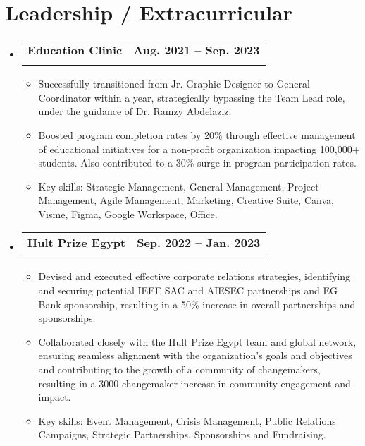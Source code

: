 \documentclass[letterpaper,11pt]{article}
\makeatletter
\newcommand{\resumeItem}[1]{
  \item\small{
    {#1 \vspace{-2pt}}
  }
}
\newcommand{\resumeSubheading}[4]{
  \vspace{-3pt}\item
    \begin{tabular*}{1.0\textwidth}[t]{l@{\extracolsep{\fill}}r}
      \textbf{#1} & \textbf{\small #2}\vspace{-3pt} \\
      \text{\footnotesize#3} & \text{\footnotesize #4} \\
    \end{tabular*}\vspace{-8pt}
}
\newcommand{\resumeSubHeadingListStart}{\begin{itemize}[leftmargin=0.0in, label={}]}
\newcommand{\resumeSubHeadingListEnd}{\end{itemize}}
\newcommand{\resumeItemListStart}{\begin{itemize}}
\newcommand{\resumeItemListEnd}{\end{itemize}\vspace{-5pt}}
\makeatother
\begin{document}
\vspace{-10pt}
\section{Leadership / Extracurricular}
    \resumeSubHeadingListStart
    \resumeSubheading
      {Education Clinic}{Aug. 2021 -- Sep. 2023}
      {General Coordinator}{Remote}
      \resumeItemListStart \vspace{-5pt}
        \resumeItem{Successfully transitioned from Jr. Graphic Designer to General Coordinator within a year, strategically bypassing the Team Lead role, under the guidance of Dr. Ramzy Abdelaziz.} \vspace{-5pt}
        \resumeItem{Boosted program completion rates by 20\% through effective management of educational initiatives for a non-profit organization impacting 100,000+ students. Also contributed to a 30\% surge in program participation rates.} \vspace{-5pt}
        \resumeItem{Key skills: Strategic Management, General Management, Project Management, Agile Management, Marketing, Creative Suite, Canva, Visme, Figma,  Google Workspace, Office.}
      \resumeItemListEnd \newpage
    \resumeSubheading
      {Hult Prize Egypt}{Sep. 2022 -- Jan. 2023}
      {Corporate Relations Specialist}{Remote}
      \resumeItemListStart \vspace{-5pt}
        \resumeItem{Devised and executed effective corporate relations strategies, identifying and securing potential IEEE SAC and AIESEC partnerships and EG Bank sponsorship, resulting in a 50\% increase in overall partnerships and sponsorships.} \vspace{-5pt}
        \resumeItem{Collaborated closely with the Hult Prize Egypt team and global network, ensuring seamless alignment with the organization's goals and objectives and contributing to the growth of a community of changemakers, resulting in a 3000 changemaker increase in community engagement and impact.} \vspace{-5pt}
        \resumeItem{Key skills: Event Management, Crisis Management, Public Relations Campaigns, Strategic Partnerships, Sponsorships and Fundraising.}
      \resumeItemListEnd
        
    \resumeSubHeadingListEnd
    \vspace{-25pt}
\end{document}

